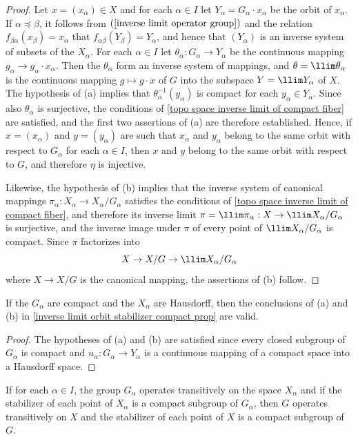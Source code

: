 \begin{proof}
Let $x=(x_\alpha)\in X$ and for each $\alpha\in I$ let $Y_\alpha=G_\alpha\cdot x_\alpha$ be the orbit of $x_\alpha$. If $\alpha\preceq\beta$, it follows from $(\ref{inverse limit operator group})$ and the relation $f_{\beta\alpha}(x_\beta)=x_\alpha$ that $f_{\alpha\beta}(Y_\beta)=Y_\alpha$, and hence that $(Y_\alpha)$ is an inverse system of subsets of the $X_\alpha$. For each $\alpha\in I$ let $\theta_\alpha:G_\alpha\to Y_\alpha$ be the continuous mapping $g_\alpha\to g_\alpha\cdot x_\alpha$. Then the $\theta_\alpha$ form an inverse system of mappings, and $\theta=\llim\theta_\alpha$ is the continuous mapping $g\mapsto g\cdot x$ of $G$ into the subspace $Y=\llim Y_\alpha$ of $X$. The hypothesis of (a) implies that $\theta_\alpha^{-1}(y_\alpha)$ is compact for each $y_\alpha\in Y_\alpha$. Since also $\theta_\alpha$ is surjective, the conditions of \cref{topo space inverse limit of compact fiber} are satisfied, and the first two assertions of (a) are therefore established. Hence, if $x=(x_\alpha)$ and $y=(y_\alpha)$ are such that $x_\alpha$ and $y_\alpha$ belong to the same orbit with respect to $G_\alpha$ for each $\alpha\in I$, then $x$ and $y$ belong to the same orbit with respect to $G$, and therefore $\eta$ is injective.\par
Likewise, the hypothesis of (b) implies that the inverse system of canonical mappings $\pi_\alpha:X_\alpha\to X_\alpha/G_\alpha$ satisfies the conditions of \cref{topo space inverse limit of compact fiber}, and therefore its inverse limit $\pi=\llim\pi_\alpha:X\to\llim X_\alpha/G_\alpha$ is surjective, and the inverse image under $\pi$ of every point of $\llim X_\alpha/G_\alpha$ is compact. Since $\pi$ factorizes into
\[X\to X/G\to\llim X_\alpha/G_\alpha\]
where $X\to X/G$ is the canonical mapping, the assertions of (b) follow.
\end{proof}
\begin{corollary}\label{inverese limit compact operation groups prop}
If the $G_\alpha$ are compact and the $X_\alpha$ are Hausdorff, then the conclusions of (a) and (b) in \cref{inverse limit orbit stabilizer compact prop} are valid.
\end{corollary}
\begin{proof}
The hypotheses of (a) and (b) are satisfied since every closed subgroup of $G_\alpha$ is compact and $u_\alpha:G_\alpha\to Y_\alpha$ is a continuous mapping of a compact space into a Hausdorff space.
\end{proof}
\begin{corollary}
If for each $\alpha\in I$, the group $G_\alpha$ operates transitively on the space $X_\alpha$ and if the stabilizer of each point of $X_\alpha$ is a compact subgroup of $G_\alpha$, then $G$ operates transitively on $X$ and the stabilizer of each point of $X$ is a compact subgroup of $G$.
\end{corollary}
